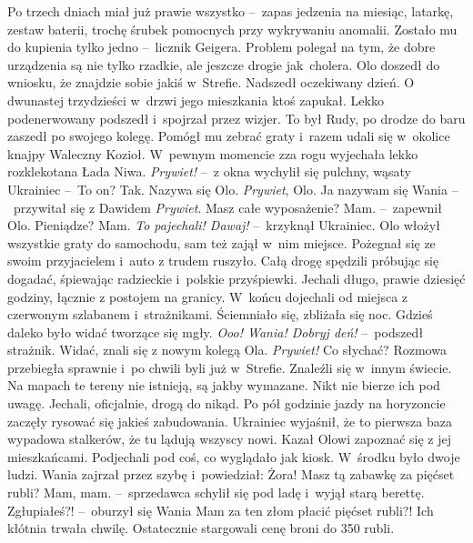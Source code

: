 \documentclass[../MAIN.tex]{subfiles}
\begin{document}
Po trzech dniach miał już prawie wszystko --~zapas jedzenia na miesiąc,
latarkę, zestaw baterii, trochę śrubek pomocnych przy wykrywaniu anomalii.
Zostało mu do kupienia tylko jedno --~licznik Geigera. Problem polegał na tym,
że dobre urządzenia są nie tylko rzadkie, ale jeszcze drogie jak~cholera. Olo
doszedł do wniosku, że znajdzie sobie jakiś w~Strefie.
Nadszedł oczekiwany dzień. O dwunastej trzydzieści w~drzwi jego mieszkania ktoś
zapukał. Lekko podenerwowany podszedł i~spojrzał przez wizjer. To był Rudy, po
drodze do baru zaszedł po swojego kolegę. Pomógł mu zebrać graty i~razem udali
się w~okolice knajpy Waleczny Kozioł. W~pewnym momencie zza rogu wyjechała lekko
rozklekotana Łada Niwa.
\dd
\sd
\xx \textit{Prywiet!} --~z okna wychylił się pulchny, wąsaty Ukrainiec --~To
on?
\xx Tak. Nazywa się Olo.
\xx \textit{Prywiet}, Olo. Ja nazywam się Wania --~przywitał się z Dawidem
\xx \textit{Prywiet}.
\xx Masz całe wyposażenie?
\xx Mam. --~zapewnił Olo.
\xx Pieniądze?
\xx Mam.
\xx \textit{To pajechali! Dawaj!} --~krzyknął Ukrainiec.
\qd
\hspace{20.4em}Olo włożył wszystkie graty do samochodu, sam też zajął w~nim
miejsce. Pożegnał
się ze swoim przyjacielem i~auto z trudem ruszyło. Całą drogę spędzili próbując
się dogadać, śpiewając radzieckie i~polskie przyśpiewki. Jechali długo, prawie
dziesięć godziny, łącznie z postojem na granicy. W~końcu dojechali od miejsca z
czerwonym szlabanem i~strażnikami. Ściemniało się, zbliżała się noc. Gdzieś
daleko było widać tworzące się mgły.
\dd
\sd
\xx
\textit{Ooo! Wania! Dobryj deń!} --~podszedł strażnik. Widać, znali się z
nowym kolegą Ola.
\xx \textit{Prywiet!} Co słychać?
\qd
\mm Rozmowa przebiegła sprawnie i~po chwili byli już w~Strefie. Znaleźli się w~innym
świecie. Na mapach te tereny nie istnieją, są jakby wymazane. Nikt nie bierze
ich pod uwagę. Jechali, oficjalnie, drogą do nikąd. Po pół godzinie jazdy na
horyzoncie zaczęły rysować się jakieś zabudowania. Ukrainiec wyjaśnił, że to
pierwsza baza wypadowa stalkerów, że tu lądują wszyscy nowi. Kazał Olowi
zapoznać się z jej mieszkańcami.
Podjechali pod coś, co wyglądało jak kiosk. W~środku było dwoje ludzi. Wania
zajrzał przez szybę i~powiedział:
\sd
\xx Żora! Masz tą zabawkę za pięćset rubli?
\xx Mam, mam. --~sprzedawca schylił się pod ladę i~wyjął starą berettę.
\xx Zgłupiałeś?! --~oburzył się Wania
\xx Mam za ten złom płacić pięćset rubli?!
\qd
Ich kłótnia trwała chwilę. Ostatecznie stargowali cenę broni do 350 rubli.
\end{document}
